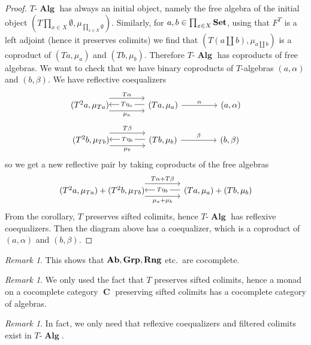 \documentclass[a4paper,11pt,fullpage,oneside,openany]{amsbook}
\newcommand{\catname}[1]{{\normalfont\textbf{#1}}}
\DeclareMathOperator{\Alg}{\mathbf{Alg}}
\newcommand{\Set}{\catname{Set}}
\newcommand{\Ab}{\catname{Ab}}
\DeclareMathOperator{\C}{\mathbf{C}}
\theoremstyle{definition}
\theoremstyle{definition}
\theoremstyle{remark}
\newtheorem{rmk}[thm]{Remark}
\begin{document}
\begin{proof}
$T\mbox{-}\Alg$ has always an initial object, namely the free algebra of the initial object $\left(T\prod_{x\in X}\emptyset,\mu_{\prod_{x\in X}\emptyset}\right)$. Similarly, for $a,b\in\prod_{x\in X}\Set$, using that $F^T$ is a left adjoint (hence it preserves colimits) we find that $\left(T\left(a\coprod b\right),\mu_{a\coprod b}\right)$ is a coproduct of $(Ta,\mu_a)$ and $(Tb,\mu_b)$. Therefore $T\mbox{-}\Alg$ has coproducts of free algebras. We want to check that we have binary coproducts of $T$-algebras $(a,\alpha)$ and $(b,\beta)$. We have reflective coequalizers
\[
\begin{tikzcd}[column sep=1.5cm]
(T^2a,\mu_{Ta})\hspace{-1.5mm}\arrow[r, shift right=1.5ex, "\mu_a"']  \arrow[r, shift left=2ex, "T\alpha"] & (Ta,\mu_a)\arrow[l, shift right=.25ex, "T\eta_a"description]\arrow[r,"\alpha"]&(a,\alpha)
\end{tikzcd}
\]
\[
\begin{tikzcd}[column sep=1.5cm]
(T^2b,\mu_{Tb})\hspace{-1.5mm}\arrow[r, shift right=1.5ex, "\mu_b"']  \arrow[r, shift left=2ex, "T\beta"] & (Tb,\mu_b)\arrow[l, shift right=.25ex, "T\eta_b"description]\arrow[r,"\beta"]&(b,\beta)
\end{tikzcd}
\]
so we get a new reflective pair by taking coproducts of the free algebras
\[
\begin{tikzcd}[column sep=1.5cm]
(T^2a,\mu_{Ta})+(T^2b,\mu_{Tb})\hspace{-1.5mm}\arrow[r, shift right=1.5ex, "\mu_a+\mu_b"']  \arrow[r, shift left=2ex, "T\alpha+T\beta"] & (Ta,\mu_a)+(Tb,\mu_b)\arrow[l, shift right=.25ex, "T\eta_b"description]
\end{tikzcd}
\]
From the corollary, $T$ preserves sifted colimits, hence $T\mbox{-}\Alg$ has reflexive coequalizers. Then the diagram above has a coequalizer, which is a coproduct of $(a,\alpha)$ and $(b,\beta)$. 
\end{proof}
\begin{rmk}
	This shows that $\Ab,\mathbf{Grp},\mathbf{Rng}$ etc.\ are cocomplete.
\end{rmk}
\begin{rmk}
	We only used the fact that $T$ preserves sifted colimits, hence a monad on a cocomplete category $\C$ preserving sifted colimits has a cocomplete category of algebras.
\end{rmk}
\begin{rmk}
	In fact, we only need that reflexive coequalizers and filtered colimits exist in $T\mbox{-}\Alg$.
\end{rmk}
\end{document}
